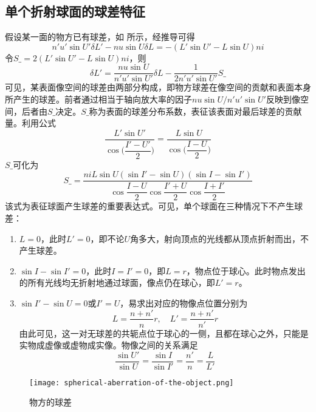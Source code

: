 \documentclass[cn,10pt,chinesefont=founder,math=newtx,cite=super,twoside]{elegantbook}
\begin{document}
\subsection{单个折射球面的球差特征}

假设某一面的物方已有球差，如 所示，经推导可得
\begin{equation}
n'u'\sin U'\delta L'-nu\sin U\delta L=-(L'\sin U'-L\sin U)ni
\end{equation}
令$S\_=2(L'\sin U'-L\sin U)ni$，则
\begin{equation}
\delta L'=\frac{nu\sin U}{n'u'\sin U'}\delta L-\frac{1}{2n'u'\sin U'}S\_
\end{equation}
可见，某表面像空间的球差由两部分构成，即物方球差在像空间的贡献和表面本身所产生的球差。前者通过相当于轴向放大率的因子$nu\sin U/n'u'\sin U'$反映到像空间，后者由$S\_$决定。$S\_$称为表面的球差分布系数，表征该表面对最后球差的贡献量。利用公式
\begin{equation}
\frac{L'\sin U'}{\cos\bigg(\dfrac{I'-U'}{2}\bigg)}=\frac{L\sin U}{\cos\bigg(\dfrac{I-U}{2}\bigg)}
\end{equation}
$S\_$可化为
\begin{equation}
S\_=\frac{niL\sin U(\sin I'-\sin U)(\sin I-\sin I')}{\cos{\dfrac{I-U}{2}}\cos{\dfrac{I'+U}{2}}\cos{\dfrac{I+I'}{2}}}
\label{eq:spherical-aberration-distribution-coefficient}
\end{equation}
该式为表征球面产生球差的重要表达式。可见，单个球面在三种情况下不产生球差：
\begin{enumerate}
	\item $L=0$，此时$L'=0$，即不论$U$角多大，射向顶点的光线都从顶点折射而出，不产生球差。
	\item $\sin I-\sin I'=0$，此时$I=I'=0$，即$L=r$，物点位于球心。此时物点发出的所有光线均无折射地通过球面，像点仍在球心，即$L'=r$。
	\item $\sin I'-\sin U=0$或$I'=U$，易求出对应的物像点位置分别为
	\begin{equation}
	L=\frac{n+n'}{n}r,\quad L'=\frac{n+n'}{n'}r
	\end{equation}
	由此可见，这一对无球差的共轭点位于球心的一侧，且都在球心之外，只能是实物成虚像或虚物成实像。物像之间的关系满足
	\begin{equation}
	\frac{\sin U'}{\sin U}=\frac{\sin I}{\sin I'}=\frac{n'}{n}=\frac{L}{L'}
	\label{eq:aplanatic-point}
	\end{equation}
\end{enumerate}

\begin{figure}[htbp]
	\centering
	\texttt{[image: spherical-aberration-of-the-object.png]}
	\caption{物方的球差}
	\label{fig:spherical-aberration-of-the-object}
\end{figure}
\end{document}
